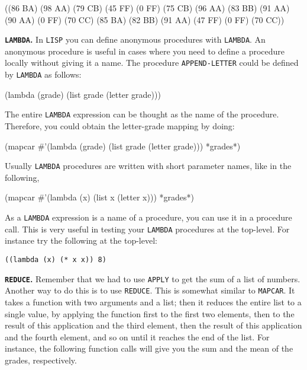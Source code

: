 \documentclass[a4paper,11pt]{article}
\begin{document}
\begin{uenum}
\begin{lispcode}
((86 BA) (98 AA) (79 CB) (45 FF) (0 FF) (75 CB) 
 (96 AA) (83 BB) (91 AA) (90 AA) (0 FF) (70 CC)
 (85 BA) (82 BB) (91 AA) (47 FF) (0 FF) (70 CC))
\end{lispcode}

\item {\bf \Verb+LAMBDA+.} In \Verb+LISP+ you can define anonymous procedures with \Verb+LAMBDA+. An anonymous procedure is useful in cases where you need to define a procedure locally without giving it a name. The procedure \Verb+APPEND-LETTER+ could be defined by \Verb+LAMBDA+ as follows:

\begin{lispcode}
(lambda (grade)
  (list grade (letter grade)))
\end{lispcode}

The entire \Verb+LAMBDA+ expression can be thought as the name of the procedure. Therefore, you could obtain the letter-grade mapping by doing:

\begin{lispcode}
(mapcar #'(lambda (grade) (list grade (letter grade))) *grades*)
\end{lispcode}

Usually \Verb+LAMBDA+ procedures are written with short parameter names, like in the following,

\begin{lispcode}
(mapcar #'(lambda (x) (list x (letter x))) *grades*)
\end{lispcode}

\begin{uenumi}
\item As a \Verb+LAMBDA+ expression is a name of a procedure, you can use it in a procedure call. This is very useful in testing your \Verb+LAMBDA+ procedures at the top-level. For instance try the following at the top-level:

\begin{Verbatim}
((lambda (x) (* x x)) 8)
\end{Verbatim}

\end{uenumi}

\item {\bf \Verb+REDUCE+.} Remember that we had to use \Verb+APPLY+ to get the sum of a list of numbers. Another way to do this is to use \Verb+REDUCE+. This is somewhat similar to \Verb+MAPCAR+. It takes a function with two arguments and a list; then it reduces the entire list to a single value, by applying the function first to the first two elements, then to the result of this application and the third element, then the result of this application and the fourth element, and so on until it reaches the end of the list. For instance, the following function calls will give you the sum and the mean of the grades, respectively.


\end{uenum}
\end{document}
